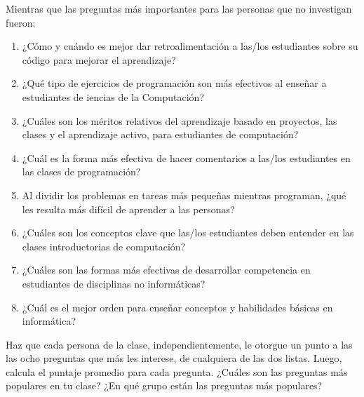 \noindent
Mientras que las preguntas más importantes para las personas que no investigan fueron:

\begin{enumerate}

\item
  ¿Cómo y cuándo es mejor dar retroalimentación a las/los estudiantes sobre su código para mejorar el aprendizaje?

\item
  ¿Qué tipo de ejercicios de programación son más efectivos al enseñar a estudiantes de iencias de la Computación?

\item
  ¿Cuáles son los méritos relativos del aprendizaje basado en proyectos, las clases y el aprendizaje activo, para estudiantes de computación?

\item
  ¿Cuál es la forma más efectiva de hacer comentarios a las/los estudiantes en las clases de programación?

\item
  Al dividir los problemas en tareas más pequeñas mientras programan, ¿qué les resulta más difícil de aprender a las personas?

\item
  ¿Cuáles son los conceptos clave que las/los estudiantes deben entender en las clases introductorias de computación?

\item
  ¿Cuáles son las formas más efectivas de desarrollar competencia en estudiantes de disciplinas no informáticas?

\item
  ¿Cuál es el mejor orden para enseñar conceptos y habilidades básicas en informática?

\end{enumerate}

Haz que cada persona de la clase, independientemente, le otorgue un punto a las
las ocho preguntas que más les interese, de cualquiera de las dos listas.
Luego, calcula el puntaje promedio para cada pregunta.
¿Cuáles son las preguntas más populares en tu clase?
¿En qué grupo  están las preguntas más populares?
